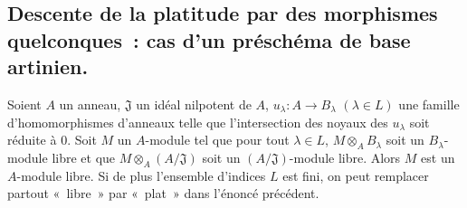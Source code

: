 \subsection{Descente de la platitude par des morphismes quelconques~: cas d'un préschéma de base artinien.}
\label{subsection:IV.11.4-fr}

\begin{theorem}[11.4.1]
\label{IV.11.4.1-fr}
Soient $A$ un anneau, $\mathfrak J$ un idéal nilpotent de $A$,
$u_\lambda:A\to B_\lambda$ $(\lambda\in L)$ une famille d'homomorphismes
d'anneaux telle que l'intersection des noyaux des $u_\lambda$ soit réduite à
$0$. Soit $M$ un $A$-module tel que pour tout $\lambda\in L$,
$M\otimes_A B_\lambda$ soit un $B_\lambda$-module libre et que
$M\otimes_A(A/\mathfrak J)$ soit un $(A/\mathfrak J)$-module libre. Alors $M$
est un $A$-module libre. Si de plus l'ensemble d'indices $L$ est fini, on peut
remplacer partout «~libre~» par «~plat~» dans l'énoncé précédent.
\end{theorem}

